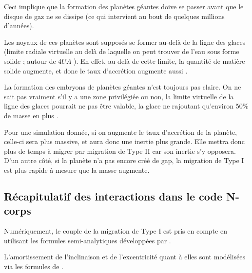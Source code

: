 Ceci implique que la formation des planètes géantes doive se passer avant que le disque de gaz ne se dissipe (ce qui intervient au bout de quelques millions d'années).

Les noyaux de ces planètes sont supposés se former au-delà de la ligne des glaces (limite radiale virtuelle au delà de laquelle on peut trouver de l'eau sous forme solide ; autour de $4\unit{UA}$ \citep{martin2013evolution}). En effet, au delà de cette limite, la quantité de matière solide augmente, et donc le taux d'accrétion augmente aussi \citep{sasselov2000snowline}.

La formation des embryons de planètes géantes n'est toujours pas claire. On ne sait pas vraiment s'il y a une zone privilégiée ou non, la limite virtuelle de la ligne des glaces pourrait ne pas être valable, la glace ne rajoutant qu'environ 50\% de masse en plus \citep{lodders2003solar}.


\bigskip

Pour une simulation donnée, si on augmente le taux d'accrétion de la planète, celle-ci sera plus massive, et aura donc une inertie plus grande. Elle mettra donc plus de temps à migrer par migration de Type II car son inertie s'y opposera. D'un autre côté, si la planète n'a pas encore créé de gap, la migration de Type I est plus rapide à mesure que la masse augmente. 

\subsection{Récapitulatif des interactions dans le code N-corps}
Numériquement, le couple de la migration de Type I est pris en compte en utilisant les formules semi-analytiques développées par \cite{paardekooper2011torque}. 

L'amortissement de l'inclinaison et de l'excentricité quant à elles sont modélisées via les formules de \cite{cresswell2008three}.
